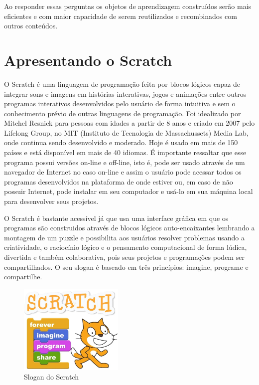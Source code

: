 \documentclass[12pt, openright, a4paper, brazil, english, french, spanish, bibjustif, openany, oneside]{abntex2}
\begin{document}
Ao responder essas perguntas os objetos de aprendizagem construídos serão mais eficientes e com maior capacidade de serem reutilizados e recombinados com outros conteúdos.


\chapter{Apresentando o Scratch}

 O Scratch é uma linguagem de programação feita por blocos lógicos capaz de integrar sons e imagens em histórias interativas, jogos e animações entre outros programas interativos desenvolvidos pelo usuário de forma intuitiva e sem o conhecimento prévio de outras linguagens de programação. Foi idealizado por Mitchel Resnick para pessoas com idades a partir de 8 anos e criado em 2007 pelo Lifelong Group, no MIT (Instituto de Tecnologia de Massachussets) Media Lab, onde continua sendo desenvolvido e moderado.  Hoje é usado em mais de 150 países e está disponível em mais de 40 idiomas. É importante ressaltar que esse programa possui versões on-line e off-line, isto é, pode ser usado através de um navegador de Internet no caso on-line e assim o usuário pode acessar todos os programas desenvolvidos na plataforma de onde estiver ou, em caso de não possuir Internet, pode instalar em seu computador e usá-lo em sua máquina local para desenvolver seus projetos.
 
 O Scratch é bastante acessível já que usa uma interface gráfica em que os programas são construidos através de blocos lógicos auto-encaixantes lembrando a montagem de um puzzle e possibilita aos usuários resolver problemas usando a criatividade, o raciocínio lógico e o pensamento computacional de forma lúdica, divertida e também colaborativa, pois seus projetos e programações podem ser compartilhados. O seu slogan é baseado em três princípios: imagine, programe e compartilhe.
 
\begin{figure}[h]

    \center
    \caption{Slogan do Scratch \label{logoscr1}}
    \includegraphics[width=5cm]{logoscratch.png}
    
\end{figure} 
\end{document}
